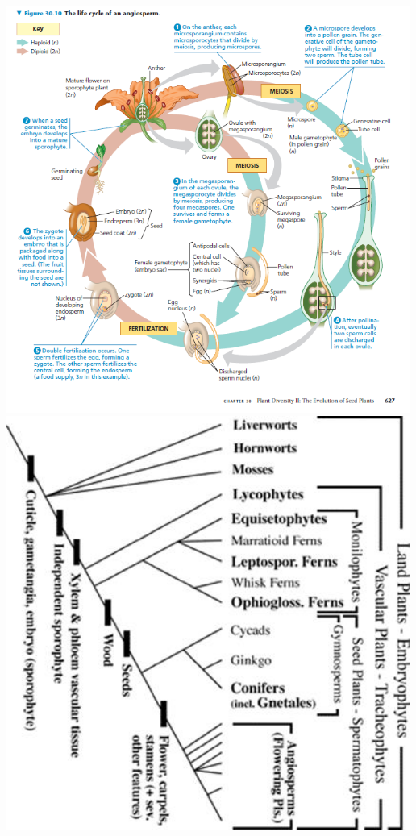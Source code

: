 \documentclass[]{book}
\begin{document}
\includegraphics[width=500px]{static/augalai/gaubtasekliai}
\includegraphics[width=500px]{static/augalai/klasifikacija}
\end{document}
